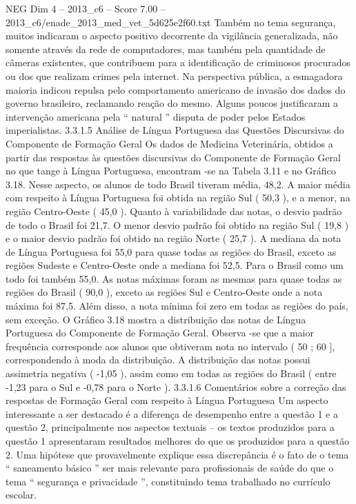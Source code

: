 \begin{textsample}{NEG Dim 4 – 2013\_c6 – Score 7.00 – 2013\_c6/enade\_2013\_med\_vet\_5d625e2f60.txt}
Também no tema segurança, muitos indicaram o aspecto positivo decorrente da vigilância generalizada, não somente através da rede de computadores, mas também pela quantidade de câmeras existentes, que contribuem para a identificação de criminosos procurados ou dos que realizam crimes pela internet.
Na perspectiva pública, a esmagadora maioria indicou repulsa pelo comportamento americano de invasão dos dados do governo brasileiro, reclamando reação do mesmo.
Alguns poucos justificaram a intervenção americana pela “ natural ” disputa de poder pelos Estados imperialistas. 3.3.1.5 Análise de Língua Portuguesa das Questões Discursivas do Componente de Formação Geral Os dados de Medicina Veterinária, obtidos a partir das respostas às questões discursivas do Componente de Formação Geral no que tange à Língua Portuguesa, encontram -se na Tabela 3.11 e no Gráfico 3.18.
Nesse aspecto, os alunos de todo Brasil tiveram média, 48,2.
A maior média com respeito à Língua Portuguesa foi obtida na região Sul ( 50,3 ), e a menor, na região Centro-Oeste ( 45,0 ).
Quanto à variabilidade das notas, o desvio padrão de todo o Brasil foi 21,7.
O menor desvio padrão foi obtido na região Sul ( 19,8 ) e o maior desvio padrão foi obtido na região Norte ( 25,7 ).
A mediana da nota de Língua Portuguesa foi 55,0 para quase todas as regiões do Brasil, exceto as regiões Sudeste e Centro-Oeste onde a mediana foi 52,5.
Para o Brasil como um todo foi também 55,0.
As notas máximas foram as mesmas para quase todas as regiões do Brasil ( 90,0 ), exceto as regiões Sul e Centro-Oeste onde a nota máxima foi 87,5.
Além disso, a nota mínima foi zero em todas as regiões do país, sem exceção.
O Gráfico 3.18 mostra a distribuição das notas de Língua Portuguesa do Componente de Formação Geral.
Observa -se que a maior frequência corresponde aos alunos que obtiveram nota no intervalo ( 50 ; 60 ], correspondendo à moda da distribuição.
A distribuição das notas possui assimetria negativa ( -1,05 ), assim como em todas as regiões do Brasil ( entre -1,23 para o Sul e -0,78 para o Norte ). 3.3.1.6 Comentários sobre a correção das respostas de Formação Geral com respeito à Língua Portuguesa Um aspecto interessante a ser destacado é a diferença de desempenho entre a questão 1 e a questão 2, principalmente nos aspectos textuais – os textos produzidos para a questão 1 apresentaram resultados melhores do que os produzidos para a questão 2.
Uma hipótese que provavelmente explique essa discrepância é o fato de o tema “ saneamento básico ” ser mais relevante para profissionais de saúde do que o tema “ segurança e privacidade ”, constituindo tema trabalhado no currículo escolar.

\end{textsample}
